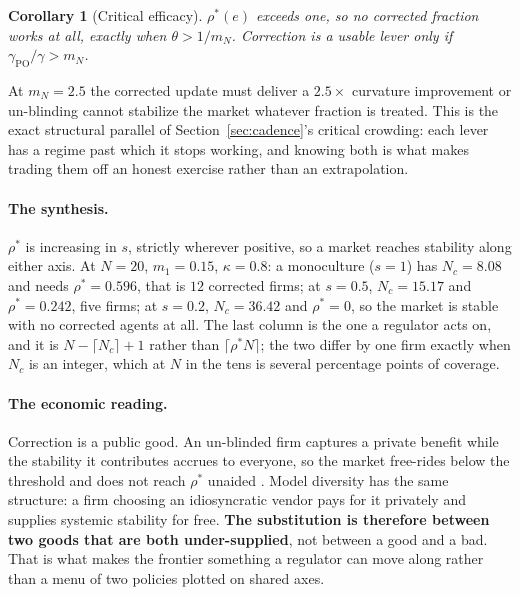 \documentclass{article}
\theoremstyle{plain}
\newtheorem{corollary}[theorem]{Corollary}
\theoremstyle{definition}
\newcommand{\mN}{m_N}
\begin{document}
\begin{corollary}[Critical efficacy]
\label{cor:efficacy}
$\rho^{*}(e)$ exceeds one, so no corrected fraction works at all, exactly when $\theta > 1/\mN$. Correction is a usable lever only if $\gamma_{\mathrm{PO}}/\gamma > \mN$.
\end{corollary}

At $\mN = 2.5$ the corrected update must deliver a $2.5\times$ curvature improvement or un-blinding cannot stabilize the market whatever fraction is treated. This is the exact structural parallel of Section~\ref{sec:cadence}'s critical crowding: each lever has a regime past which it stops working, and knowing both is what makes trading them off an honest exercise rather than an extrapolation.

\paragraph{The synthesis.}
$\rho^{*}$ is increasing in $s$, strictly wherever positive, so a market reaches stability along either axis. At $N=20$, $m_1 = 0.15$, $\kappa = 0.8$: a monoculture ($s=1$) has $N_c = 8.08$ and needs $\rho^{*} = 0.596$, that is $12$ corrected firms; at $s = 0.5$, $N_c = 15.17$ and $\rho^{*} = 0.242$, five firms; at $s = 0.2$, $N_c = 36.42$ and $\rho^{*} = 0$, so the market is stable with no corrected agents at all. The last column is the one a regulator acts on, and it is $N - \lceil N_c \rceil + 1$ rather than $\lceil \rho^{*}N \rceil$; the two differ by one firm exactly when $N_c$ is an integer, which at $N$ in the tens is several percentage points of coverage.

\paragraph{The economic reading.}
Correction is a public good. An un-blinded firm captures a private benefit while the stability it contributes accrues to everyone, so the market free-rides below the threshold and does not reach $\rho^{*}$ unaided \citep{bergstrom1986}. Model diversity has the same structure: a firm choosing an idiosyncratic vendor pays for it privately and supplies systemic stability for free. \textbf{The substitution is therefore between two goods that are both under-supplied}, not between a good and a bad. That is what makes the frontier something a regulator can move along rather than a menu of two policies plotted on shared axes.
\end{document}
